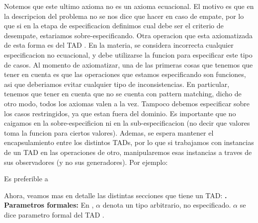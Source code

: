\documentclass[10pt,a4paper]{article}
\begin{document}
Notemos que este ultimo axioma no es un axioma ecuacional. El motivo es que en la descripcion del problema no se nos dice que hacer en caso de empate, por lo que si en la etapa de especificacion definimos cual debe ser el criterio de desempate, estariamos sobre-especificando. Otra operacion que esta axiomatizada de esta forma es  del TAD . En la materia, se considera incorrecta cualquier especificacion no ecuacional, y debe utilizarse la funcion  para especificar este tipo de casos.
\newline
\newline
Al momento de axiomatizar, una de las primeras cosas que tenemos que tener en cuenta es que las operaciones que estamos especificando son funciones, asi que deberiamos evitar cualquier tipo de inconsistencias. En particular, tenemos que tener en cuenta que no se cuenta con pattern matching, dicho de otro modo, todos los axiomas valen a la vez. Tampoco debemos especificar sobre los casos restringidos, ya que estan fuera del dominio. Es importante que no caigamos en la sobre-especificion ni en la sub-especificacion (no decir que valores toma la funcion para ciertos valores). 
\newline
\newline
Ademas, se espera mantener el encapsulamiento entre los distintos TADs, por lo que si trabajamos con instancias de un TAD en las operaciones de otro, manipularemos esas instancias a traves de sus observadores (y no sus generadores). Por ejemplo: 
\newpage
\begin{tad}{}
	\medskip
	\medskip
	
	\medskip
	\medskip
	\medskip
	Es preferible a
	\medskip
	\medskip
	\medskip
	\medskip
	\medskip
\end{tad}
\medskip
\medskip
Ahora, veamos mas en detalle las distintas secciones que tiene un TAD: 
\newline
\newline
\textbf{.} \textbf{Parametros formales:} En , $\alpha$ denota un tipo arbitrario, no especificado. $\alpha$ se dice parametro formal del TAD . 
\end{document}

